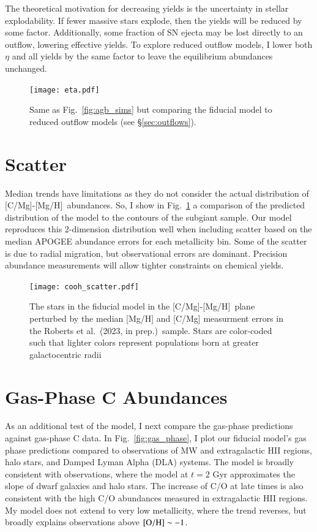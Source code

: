 \documentclass[12pt,oneside]{report}
\newcommand{\caah}{[C/Mg]-[Mg/H]}
\newcommand{\citetjack}{Roberts et al.~(2023, in prep.)}
\begin{document}
The theoretical motivation for decreasing yields is the uncertainty in stellar explodability.
If fewer massive stars explode, then the yields will be reduced by some factor. Additionally, some fraction of SN ejecta may be lost directly to an outflow, lowering effective yields. To explore reduced outflow models, I lower both $\eta$ and all yields by the same factor to leave the equilibrium abundances unchanged. 

\begin{figure}

\texttt{[image: eta.pdf]}

\caption[Reduced-outflow models]{Same as Fig.~\ref{fig:agb_sims} but comparing the fiducial model to reduced outflow models (see \S \ref{sec:outflows}).}
\end{figure}


\section{Scatter}

Median trends have limitations as they do not consider the actual distribution of \caah~abundances. So, I show in Fig.~\ref{fig:scatter} a comparison of the predicted distribution of the model to the contours of the subgiant sample. Our model reproduces this 2-dimension distribution well when including scatter based on the median APOGEE abundance errors for each metallicity bin. Some of the scatter is due to radial migration, but observational errors are dominant. Precision abundance measurements will allow tighter constraints on chemical yields. 

\begin{figure}
    \centering
    \texttt{[image: cooh\_scatter.pdf]}
    \caption[Scatter agreement]{The stars in the fiducial model in the \caah~plane perturbed by the median [Mg/H] and [C/Mg] measurment errors in the \citetjack~sample. Stars are color-coded such that lighter colors represent populations born at greater galactocentric radii
    }
    \label{fig:scatter}
\end{figure}



\section{Gas-Phase C Abundances}\label{sec:gas}

As an additional test of the model, I next compare the gas-phase predictions against gas-phase C data. In Fig.~\ref{fig:gas_phase}, I plot our fiducial model's gas phase predictions compared to observations of MW and extragalactic HII regions, halo stars, and Damped Lyman Alpha (DLA) systems. The model is broadly consistent with observations, where the model at $t=2$ Gyr approximates the slope of dwarf galaxies and halo stars. The increase of C/O at late times is also consistent with the high C/O abundances measured in extragalactic HII regions. 
My model does not extend to very low metallicity, where the trend reverses, but broadly explains observations above $\rm [O/H] \sim -1$. 
\end{document}

